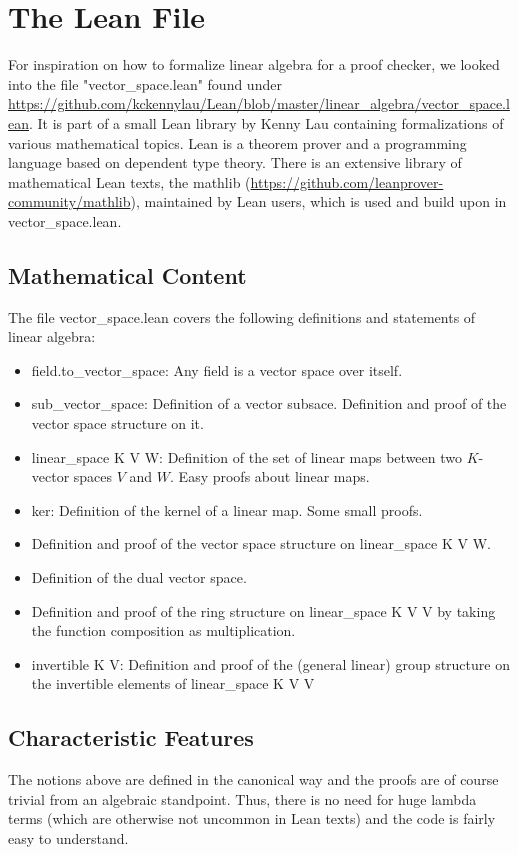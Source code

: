 \documentclass[11pt]{article}
\begin{document}
\newpage
\lstset{style=lean}
\section{The Lean File}
For inspiration on how to formalize linear algebra for a proof checker, we looked into the file "vector\_space.lean" found under \url{https://github.com/kckennylau/Lean/blob/master/linear_algebra/vector_space.lean}. It is part of a small Lean library by Kenny Lau containing formalizations of various mathematical topics. Lean is a theorem prover and a programming language based on dependent type theory. There is an extensive library of mathematical Lean texts, the mathlib (\url{https://github.com/leanprover-community/mathlib}), maintained by Lean users, which is used and build upon in vector\_space.lean.



\subsection{Mathematical Content} \label{mathematicalContent}
The file vector\_space.lean covers the following definitions and statements of linear algebra:
\begin{itemize}
\item {\lean field.to\_vector\_space}: Any field is a vector space over itself.
\item {\lean sub\_vector\_space}: Definition of a vector subsace. Definition and proof of the vector space structure on it.
\item {\lean linear\_space K V W}: Definition of the set of linear maps between two $K$-vector spaces $V$ and $W$. Easy proofs about linear maps.
\item {\lean ker}: Definition of the kernel of a linear map. Some small proofs.
\item Definition and proof of the vector space structure on {\lean linear\_space K V W}.
\item Definition of the dual vector space.
\item Definition and proof of the ring structure on {\lean linear\_space K V V} by taking the function composition as multiplication.
\item {\lean invertible K V}: Definition and proof of the (general linear) group structure on the invertible elements of {\lean linear\_space K V V}
\end{itemize}


%
\subsection{Characteristic Features} \label{characteristics}
The notions above are defined in the canonical way and the proofs are of course trivial from an algebraic standpoint. Thus, there is no need for huge lambda terms (which are otherwise not uncommon in Lean texts) and the code is fairly easy to understand.
\end{document}
